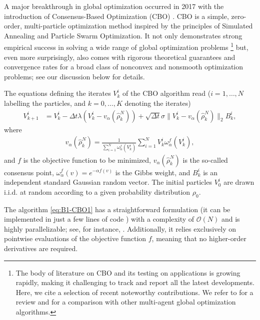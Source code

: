 \documentclass[a4paper, 11pt]{article}
\theoremstyle{plain}
\theoremstyle{remark}
\theoremstyle{definition}
\begin{document}
A major breakthrough in global optimization occurred in 2017 with the introduction of Consensus-Based Optimization (CBO) \cite{B1-pinnau2017consensus}. CBO is a simple, zero-order, multi-particle optimization method inspired by the principles of Simulated Annealing and Particle Swarm Optimization. It not only demonstrates strong empirical success in solving a wide range of global optimization problems \cite{totzeck2018numerical,B1-fornasier2020consensus_sphere_convergence,B1-riedl2022leveraging,B1-carrillo2019consensus,B1-fornasier2021anisotropic,B1-riedl2022leveraging,JMLR:v25:23-0764,B1-kim2020stochastic, B1-ha2021emergent, B1-borghi2021constrained,B1-bostan2013asymptotic,B1-borghi2022consensus, B1-borghi2022adaptive,B1-qiu2022Saddlepoints,B1-carrillo2022sampling,B1-totzeck2020consensus, B1-grassi2021mean,B1-chen2020consensus,B1-schillings2022Ensemble}\footnote{The body of literature on CBO and its testing on applications is growing rapidly, making it challenging to track and report all the latest developments. Here, we cite a selection of recent noteworthy contributions. We refer to \cite{totzeck2021trends} for a  review and \cite{totzeck2018numerical} for a comparison with other multi-agent global optimization algorithms.} but, even more surprisingly, also comes with rigorous theoretical guarantees and convergence rates for a broad class of nonconvex and nonsmooth optimization problems; see our discussion below for details.

The equations defining the iterates $V^i_k$ of the CBO algorithm read ($i=1,\dots,N$ labelling the particles, and $k=0,\dots,K$ denoting the iterates)
\begin{align}
\label{eq:B1-CBO1}
V^i_{k+1} &= V^i_{k} - \Delta t \lambda(V^i_k-v_{\alpha}(\widehat \rho_k^N)) + \sqrt{\Delta t}\sigma \|V^i_k-v_{\alpha}(\widehat  \rho_k^N)\|_2  B_k^i, 
\end{align}
where
\begin{align}
v_{\alpha}(\widehat \rho_k^N) = \frac{1 }{\sum_{i=1}^N \omega_\alpha^f(V_k^i)} \sum_{i=1}^N V_k^i \omega_\alpha^f(V_k^i), 
\end{align}
and $f$ is the objective function to be minimized, $v_{\alpha}(\widehat \rho_k^N)$ is the so-called consensus point, $\omega_\alpha^f(v)=e^{-\alpha {f}(v)}$ is  the Gibbs weight, and $B^i_k$ is an independent standard Gaussian random vector. The initial {particles} $V_0^i$ are drawn i.i.d. at random according to a given probability distribution $\rho_0$.


The algorithm \eqref{eq:B1-CBO1} has a straightforward formulation (it can be implemented in just a few lines of code \cite{CBX2024code}) with a complexity of $\mathcal O(N)$ and is highly parallelizable; see, for instance, \cite{benfenati22,JMLR:v25:23-0764}. Additionally, it relies exclusively on pointwise evaluations of the objective function $f$, meaning that no higher-order derivatives are required.  
\end{document}
